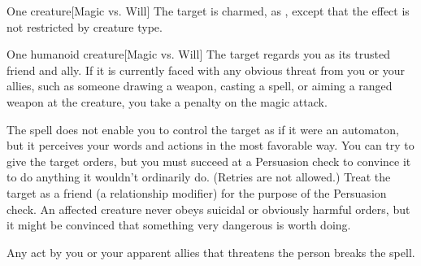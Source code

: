\begin{spellheader}
    \spellrng{\rngmed}
    \spelldur{\durlong}
\end{spellheader}
\begin{spelleffects}
    \begin{spelltarget}{One creature}[Magic vs. Will]
        \spellsuccess The target is charmed, as , except that the effect is not restricted by creature type.
    \end{spelltarget}
\end{spelleffects}

\begin{spellheader}
    \spellrng{\rngmed}
    \spelldur{\durlong}
\end{spellheader}
\begin{spelleffects}
    \begin{spelltarget}{One humanoid creature}[Magic vs. Will]
        \spellsuccess The target regards you as its trusted friend and ally. If it is currently faced with any obvious threat from you or your allies, such as someone drawing a weapon, casting a spell, or aiming a ranged weapon at the creature, you take a  penalty on the magic attack.
        \par The spell does not enable you to control the target as if it were an automaton, but it perceives your words and actions in the most favorable way. You can try to give the target orders, but you must succeed at a Persuasion check to convince it to do anything it wouldn't ordinarily do. (Retries are not allowed.) Treat the target as a friend (a  relationship modifier) for the purpose of the Persuasion check. An affected creature never obeys suicidal or obviously harmful orders, but it might be convinced that something very dangerous is worth doing.
    \end{spelltarget}
\end{spelleffects}
\begin{spellfooter}
    \spellnotes Any act by you or your apparent allies that threatens the  person breaks the spell.

    \norepeatspellnotes
\end{spellfooter}

